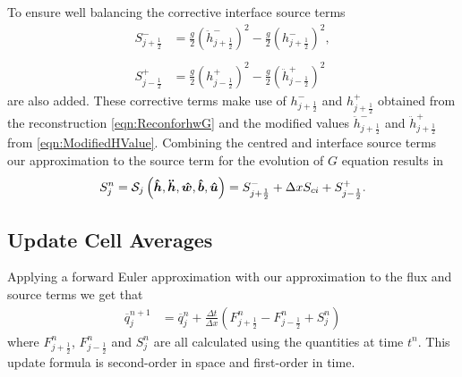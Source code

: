 To ensure well balancing the corrective interface source terms
	\begin{align*}
	 S^{-}_{j + \frac{1}{2}} &=  \frac{g}{2} \left(\ddot{h}^{-}_{j + \frac{1}{2}} \right)^2 - \frac{g}{2} \left(h^{-}_{j + \frac{1}{2}} \right)^2, \\ \\
	  S^{+}_{j - \frac{1}{2}} &=  \frac{g}{2} \left(h^{+}_{j - \frac{1}{2}}\right)^2 - \frac{g}{2}\left(\ddot{h}^{+}_{j - \frac{1}{2}}\right)^2 
	\end{align*}
are also added. These corrective terms make use of $h^{-}_{j + \frac{1}{2}}$ and $h^{+}_{j + \frac{1}{2}}$ obtained from the reconstruction \eqref{eqn:ReconforhwG} and the modified values $\ddot{h}^{-}_{j + \frac{1}{2}}$ and $\ddot{h}^{+}_{j + \frac{1}{2}}$ from \eqref{eqn:ModifiedHValue}. Combining the centred and interface source terms our approximation to the source term for the evolution of $G$ equation results in 
\begin{equation}
S^n_j = \mathcal{S}_j\left( \boldsymbol{\hat{h}},\boldsymbol{\ddot{h}},\boldsymbol{\hat{w}},\boldsymbol{\hat{b}}, \boldsymbol{\hat{u}}  \right) =  S^{-}_{j + \frac{1}{2}} + \Delta x S_{ci} + S^{+}_{j - \frac{1}{2}}.
\label{eqn:SourceTerm}
\end{equation}


\subsection{Update Cell Averages}
Applying a forward Euler approximation with our approximation to the flux and source terms we get that
\begin{align}
\overline{q}^{n+1}_j &= \overline{q}^{n}_j + \frac{\Delta t}{\Delta x} \left(F^n_{j+\frac{1}{2}} - F^n_{j-\frac{1}{2}} + S^n_j\right)
\label{eqn:UpdateMethod}
\end{align}
where $F^n_{j+\frac{1}{2}}$, $F^n_{j-\frac{1}{2}}$ and $S^n_j$ are all calculated using the quantities at time $t^n$. This update formula is second-order in space and first-order in time.


